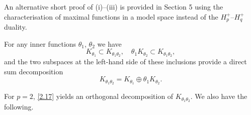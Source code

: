 \documentclass[11pt]{article}
\renewcommand\phi{\varphi}
\newtheorem{cor}[thm]{Corollary}
\numberwithin{equation}{section}
\def\beginpf{\begin{proof}}
\def\endpf{\end{proof}}
\def\beq{\begin{equation}}
\def\eeq{\end{equation}}
\begin{document}


An alternative short proof of (i)--(iii) is provided in Section 5 using the characterisation of maximal functions in a model space instead of the $H_p^+$--$H_q^+$ duality.

For any inner functions $\theta_1$, $\theta_2$ we have
\beq \label{2.16}
 K_{\theta_1} \subset K_{\theta_1\theta_2}, \quad \theta_1 K_{\theta_2} \subset K_{\theta_1\theta_2},
 \eeq
 and the
two subspaces at the left-hand side of these inclusions provide a direct sum decomposition
\beq \label{2.17}
K_{\theta_1\theta_2} = K_{\theta_1} \oplus \theta_1 K_{\theta_2}.
\eeq




For $p=2$, \eqref{2.17} yields an orthogonal decomposition of $K_{\theta_1\theta_2}$. %
We also have the following.
\end{document}
